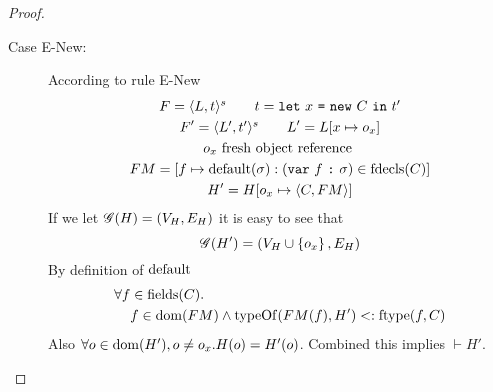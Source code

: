 \begin{proof}
\begin{description}
\begin{description}
\begin{description}
            \item[Case {\sc E-New}:] According to rule {\sc E-New}
              \begin{equation} \label{eq:enew1}
                \begin{gathered} 
                  F = \mbox{$\langle L, t \rangle^s$} \quad\quad t = \mbox{\texttt{let}~$x$~\texttt{=}~$\mbox{\texttt{new}~$C$}$~\texttt{in}~$t'$} \\
                  F' = \mbox{$\langle L', t' \rangle^s$} \quad\quad L' = L[x \mapsto o_x] \\
                  o_x \text{ fresh object reference } \\
                  FM = [f \mapsto \mbox{$\mathrm{default}$}(\sigma): (\mbox{\texttt{var}~$f$~\texttt{:}~$\sigma$}) \in
                  \mbox{$\mathrm{fdecls}$}(C)] \\
                  H' = H[o_x \mapsto \mbox{$\langle C, FM \rangle$}]
                \end{gathered}
              \end{equation}
              If we let $\mathscr{G}(H) = (V_H, E_H)$ it is easy to see that
              \begin{equation}
                \mathscr{G}(H') = ( V_H \cup \left\{ o_x \right\}, E_H )
              \end{equation}
              By definition of $\mbox{$\mathrm{default}$}$
              \begin{equation}
                \begin{aligned}
                  \forall f &\in \mbox{$\mathrm{fields}$}(C).\\
                  &f \in \mbox{$\mathrm{dom}$}(FM) \land \mbox{$\mathrm{typeOf}$}(FM(f), H') <: \mbox{$\mathrm{ftype}$}(f, C)
                \end{aligned}
              \end{equation}
              Also $\forall o \in \mbox{$\mathrm{dom}$}(H'), o \neq o_x. H(o) = H'(o)$.
              Combined this implies $\vdash H'$.


\end{description}
\end{description}
\end{description}
\end{proof}
